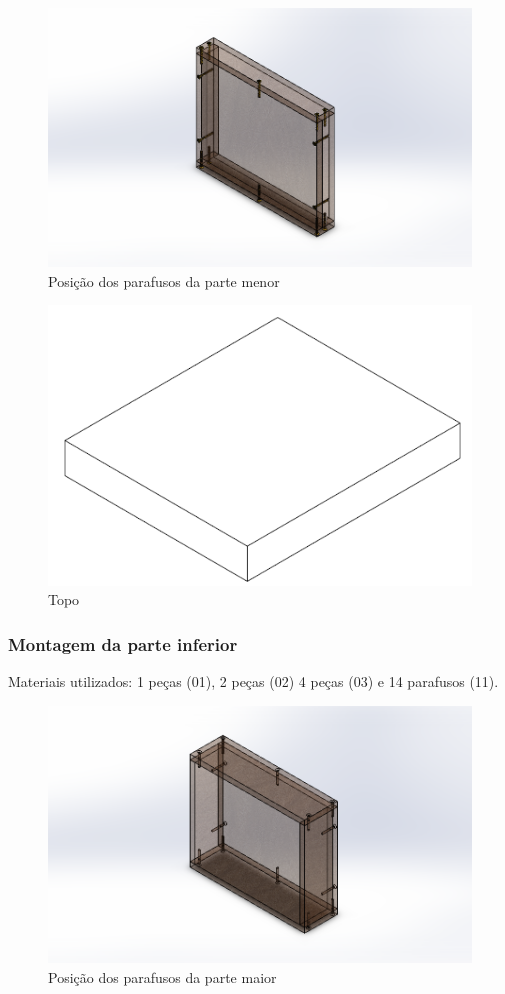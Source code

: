 \begin{figure} [H]
    \centering
    \includegraphics[width=.7\textwidth]{Figuras/montagemMaletasEstrutura/controleLadoMenor.png}
    \caption{Posição dos parafusos da parte menor}
    \label{fig:controleLadoMenor}
\end{figure}

\begin{figure} [H]
    \centering
    \includegraphics[width=.7\textwidth]{Figuras/gcs/topo.png}
    \caption{Topo}
    \label{fig:topo}
\end{figure}

\subsubsection{Montagem da parte inferior}

Materiais utilizados: 1 peças (01), 2 peças (02) 4 peças (03) e 14 parafusos (11).

\begin{figure} [H]
    \centering
    \includegraphics[width=.7\textwidth]{Figuras/montagemMaletasEstrutura/controleLadoMaior.png}
    \caption{Posição dos parafusos da parte maior}
    \label{fig:controleLadoMaior}
\end{figure}


